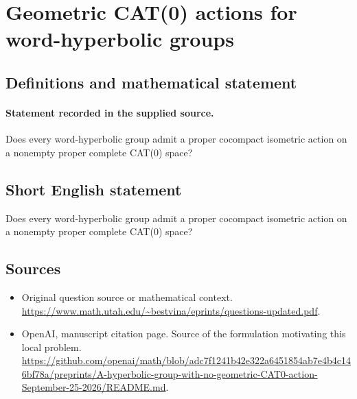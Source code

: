 \documentclass[11pt]{article}
\begin{document}
\section*{Geometric CAT(0) actions for word-hyperbolic groups}\label{statement}
\subsection{Definitions and mathematical statement}
\paragraph{Statement recorded in the supplied source.}
Does every word-hyperbolic group admit a proper cocompact isometric action on a nonempty proper complete CAT(0) space?
\subsection{Short English statement}
Does every word-hyperbolic group admit a proper cocompact isometric action on a nonempty proper complete CAT(0) space?
\subsection{Sources}
\begin{itemize}
\item[S1] Original question source or mathematical context.
\url{https://www.math.utah.edu/~bestvina/eprints/questions-updated.pdf}.
\item[S2] OpenAI, manuscript citation page. Source of the formulation motivating this local problem.
\url{https://github.com/openai/math/blob/adc7f1241b42e322a6451854ab7e4b4c146bf78a/preprints/A-hyperbolic-group-with-no-geometric-CAT0-action-September-25-2026/README.md}.
\end{itemize}
\end{document}
